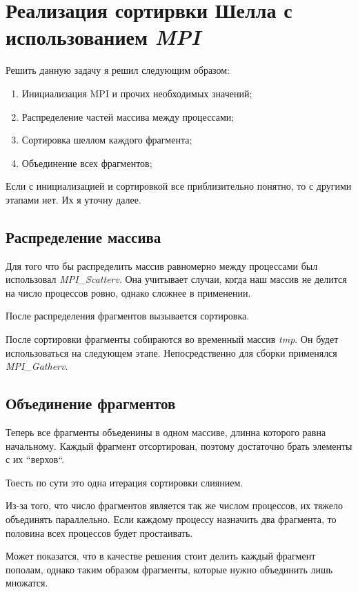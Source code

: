 \documentclass[a4paper, 12pt]{article}
\begin{document}
\section{Реализация сортирвки Шелла с использованием \textit{MPI}}

Решить данную задачу я решил следующим образом:
\begin{enumerate}
 \item Инициализация MPI и прочих необходимых значений;
 \item Распределение частей массива между процессами;
 \item Сортировка шеллом каждого фрагмента;
 \item Объединение всех фрагментов;
\end{enumerate}

Если с инициализацией и сортировкой все приблизительно понятно, то с другими этапами нет. Их я уточну далее.

\subsection{Распределение массива}

Для того что бы распределить массив равномерно между процессами был использовал \textit{MPI\_Scatterv}. Она учитывает случаи, когда наш массив не делится на число процессов ровно, однако сложнее в применении.

После распределения фрагментов вызывается сортировка.

После сортировки фрагменты собираются во временный массив \textit{tmp}. Он будет использоваться на следующем этапе. Непосредственно для сборки применялся \textit{MPI\_Gatherv}.

\subsection{Объединение фрагментов}

Теперь все фрагменты объеденины в одном массиве, длинна которого равна начальному. Каждый фрагмент отсортирован, поэтому достаточно брать элементы с их ``верхов``.

Тоесть по сути это одна итерация сортировки слиянием.

Из-за того, что число фрагментов является так же числом процессов, их тяжело объединять параллельно. Если каждому процессу назначить два фрагмента, то половина всех процессов будет простаивать.

Может показатся, что в качестве решения стоит делить каждый фрагмент пополам, однако таким образом фрагменты, которые нужно объединить лишь множатся.
\end{document}
